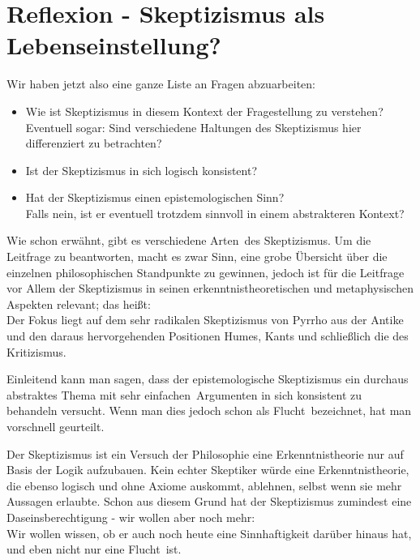 \documentclass[12pt,a4paper]{article}
\begin{document}
\section{Reflexion - Skeptizismus als Lebenseinstellung?}
Wir haben jetzt also eine ganze Liste an Fragen abzuarbeiten:
\begin{itemize}
\item Wie ist Skeptizismus in diesem Kontext der Fragestellung zu verstehen?\\
Eventuell sogar: Sind verschiedene Haltungen des Skeptizismus hier differenziert zu betrachten?
\item Ist der Skeptizismus in sich logisch konsistent?
\item Hat der Skeptizismus einen epistemologischen Sinn?\\
Falls nein, ist er eventuell trotzdem sinnvoll in einem abstrakteren Kontext? %
\end{itemize}
%
Wie schon erwähnt, gibt es verschiedene \glqq Arten\grqq\  des Skeptizismus. Um die Leitfrage zu beantworten, macht es zwar Sinn, eine grobe Übersicht über die einzelnen philosophischen Standpunkte zu gewinnen, jedoch ist für die Leitfrage vor Allem der Skeptizismus in seinen erkenntnistheoretischen und metaphysischen Aspekten relevant; das heißt:\\
Der Fokus liegt auf dem sehr radikalen Skeptizismus von Pyrrho aus der Antike und den daraus hervorgehenden Positionen Humes, Kants und schließlich die des Kritizismus.

Einleitend kann man sagen, dass der epistemologische Skeptizismus ein durchaus abstraktes Thema mit sehr \glqq einfachen\grqq\ Argumenten in sich konsistent zu behandeln versucht. Wenn man dies jedoch schon als \glqq Flucht\grqq\ bezeichnet, hat man vorschnell geurteilt.

Der Skeptizismus ist ein Versuch der Philosophie eine Erkenntnistheorie nur auf Basis der Logik aufzubauen. Kein echter Skeptiker würde eine Erkenntnistheorie, die ebenso logisch und ohne Axiome auskommt, ablehnen, selbst wenn sie mehr Aussagen erlaubte. Schon aus diesem Grund hat der Skeptizismus zumindest eine Daseinsberechtigung - wir wollen aber noch mehr:\\
Wir wollen wissen, ob er auch noch heute eine Sinnhaftigkeit darüber hinaus hat, und eben nicht nur eine \glqq Flucht\grqq\ ist.
\end{document}
